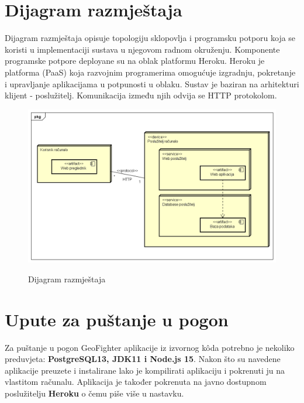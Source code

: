 		    \eject
		
		
		\section{Dijagram razmještaja}
			
			 \textnormal{Dijagram razmještaja opisuje topologiju sklopovlja i programsku potporu koja se koristi u implementaciji sustava u njegovom radnom okruženju. Komponente programske potpore deployane su na oblak platformu Heroku. Heroku je platforma (PaaS) koja razvojnim programerima omogućuje izgradnju, pokretanje i upravljanje aplikacijama u potpunosti u oblaku. Sustav je baziran na arhitekturi klijent - poslužitelj. Komunikacija između njih odvija se HTTP protokolom.}
			
			
			\begin{figure}[H]
				\centering
				\includegraphics[scale=0.58]{dijagrami/Deployment Diagram0} \\
				\caption{Dijagram razmještaja}
				\label{fig:UC8_sekvencijski}
			\end{figure}
		
			\eject
		
		\section{Upute za puštanje u pogon}
		
			\textnormal{Za puštanje u pogon GeoFighter aplikacije iz izvornog kôda potrebno je nekoliko preduvjeta: \textbf{PostgreSQL13, JDK11 i Node.js 15}. Nakon što su navedene aplikacije preuzete i instalirane lako je kompilirati aplikaciju i pokrenuti ju na vlastitom računalu. Aplikacija je također pokrenuta na javno dostupnom poslužitelju \textbf{Heroku} o čemu piše više u nastavku.\\}
			
